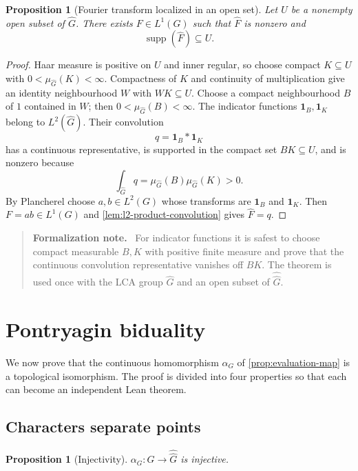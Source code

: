 \documentclass[11pt]{article}
\newtheorem{proposition}[theorem]{Proposition}
\theoremstyle{definition}
\theoremstyle{remark}
\newcommand{\one}{\mathbf 1}
\newcommand{\supp}{\operatorname{supp}}
\newcommand{\Lp}[1]{L^{#1}}
\newcommand{\dual}[1]{\widehat{#1}}
\newcommand{\bidual}[1]{\widehat{\widehat{#1}}}
\newenvironment{formalization}
  {\begin{quote}\small\noindent\textbf{Formalization note.}\ }
  {\end{quote}}
\begin{document}
\begin{proposition}[Fourier transform localized in an open set]
\label{prop:localized-fourier}
Let $U$ be a nonempty open subset of $\dual G$.  There exists
$F\in\Lp1(G)$ such that $\widehat F$ is nonzero and
\[
  \supp(\widehat F)\subseteq U.
\]
\end{proposition}

\begin{proof}
Haar measure is positive on $U$ and inner regular, so choose compact
$K\subseteq U$ with $0<\mu_{\dual G}(K)<\infty$.  Compactness of $K$ and continuity of
multiplication give an identity neighbourhood $W$ with $WK\subseteq U$.  Choose a
compact neighbourhood $B$ of $1$ contained in $W$; then
$0<\mu_{\dual G}(B)<\infty$.  The indicator functions $\one_B,\one_K$ belong to
$\Lp2(\dual G)$.  Their convolution
\[
  q=\one_B*\one_K
\]
has a continuous representative, is supported in the compact set $BK\subseteq U$, and
is nonzero because
\[
  \int_{\dual G}q
  =\mu_{\dual G}(B)\mu_{\dual G}(K)>0.
\]
By Plancherel choose $a,b\in\Lp2(G)$ whose transforms are $\one_B$ and $\one_K$.
Then $F=ab\in\Lp1(G)$ and
\cref{lem:l2-product-convolution} gives $\widehat F=q$.
\end{proof}

\begin{formalization}
For indicator functions it is safest to choose compact measurable $B,K$ with positive
finite measure and prove that the continuous convolution representative vanishes off
$BK$.  The theorem is used once with the LCA group $\dual G$ and an open subset of
$\bidual G$.
\end{formalization}

\section{Pontryagin biduality}
\label{sec:biduality}

We now prove that the continuous homomorphism $\alpha_G$ of
\cref{prop:evaluation-map} is a topological isomorphism.  The proof is divided into four
properties so that each can become an independent Lean theorem.

\subsection{Characters separate points}

\begin{proposition}[Injectivity]
\label{prop:alpha-injective}
$\alpha_G:G\to\bidual G$ is injective.
\end{proposition}
\end{document}
